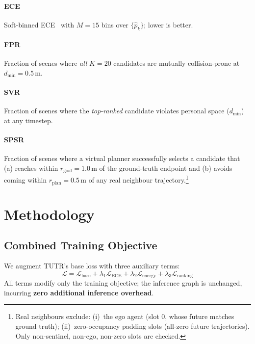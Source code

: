 \documentclass[journal]{IEEEtran}
\begin{document}
\paragraph{ECE} Soft-binned ECE~\cite{karandikar2021soft} with
$M{=}15$ bins over $\{\hat{p}_k\}$; lower is better.

\paragraph{FPR} Fraction of scenes where \emph{all} $K{=}20$
candidates are mutually collision-prone at $d_\text{min}{=}0.5$\,m.

\paragraph{SVR} Fraction of scenes where the \emph{top-ranked}
candidate violates personal space ($d_\text{min}$) at any timestep.

\paragraph{SPSR} Fraction of scenes where a virtual planner
successfully selects a candidate that (a) reaches within
$r_\text{goal}{=}1.0$\,m of the ground-truth endpoint and (b) avoids
coming within $r_\text{plan}{=}0.5$\,m of any real neighbour
trajectory.\footnote{Real neighbours exclude: (i)~the ego agent (slot
0, whose future matches ground truth); (ii)~zero-occupancy padding
slots (all-zero future trajectories). Only non-sentinel, non-ego,
non-zero slots are checked.}

\section{Methodology}
\label{sec:method}

\subsection{Combined Training Objective}

We augment TUTR's base loss with three auxiliary terms:
\begin{equation}
  \mathcal{L} = \mathcal{L}_{\text{base}} +
                \lambda_1\mathcal{L}_{\text{ECE}} +
                \lambda_2\mathcal{L}_{\text{energy}} +
                \lambda_3\mathcal{L}_{\text{ranking}}
  \label{eq:combined}
\end{equation}
All terms modify only the training objective; the inference graph is
unchanged, incurring \textbf{zero additional inference overhead}.
\end{document}
